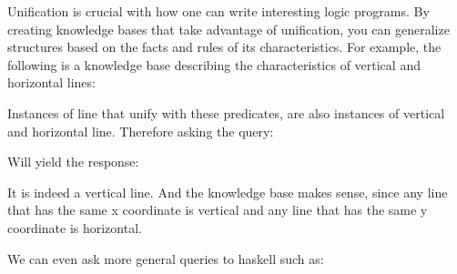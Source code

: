 Unification is crucial with how one can write interesting logic
programs. By creating knowledge bases that take advantage of
unification, you can generalize structures based on the facts and rules
of its characteristics. For example, the following is a knowledge base
describing the characteristics of vertical and horizontal lines:

\begin{Shaded}
\begin{Highlighting}[]
\KeywordTok{,}\NormalTok{)}\KeywordTok{,}\KeywordTok{,}\NormalTok{)))}
\KeywordTok{,}\NormalTok{)}\KeywordTok{,}\KeywordTok{,}\NormalTok{)))} 
\end{Highlighting}
\end{Shaded}

Instances of line that unify with these predicates, are also instances
of vertical and horizontal line. Therefore asking the query:

\begin{Shaded}
\begin{Highlighting}[]
\KeywordTok{,}\NormalTok{)}\KeywordTok{,}\KeywordTok{,}\NormalTok{)))}
\end{Highlighting}
\end{Shaded}

Will yield the response:

\begin{Shaded}
\begin{Highlighting}[]
\end{Highlighting}
\end{Shaded}

It is indeed a vertical line. And the knowledge base makes sense, since
any line that has the same x coordinate is vertical and any line that
has the same y coordinate is horizontal.

We can even ask more general queries to haskell such as:

\begin{Shaded}
\begin{Highlighting}[]
\KeywordTok{,}\NormalTok{)}\KeywordTok{,}\KeywordTok{,}\NormalTok{)))}
\end{Highlighting}
\end{Shaded}

